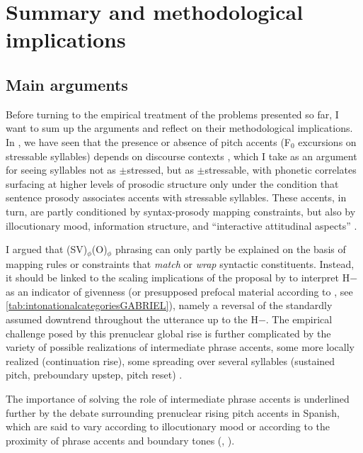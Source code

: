 
\chapter{Summary and methodological implications}
\label{ch:4} %

\section{Main arguments}
\label{ch:4.1}

Before turning to the empirical treatment of the problems presented so far, I want to sum up the arguments and reflect on their methodological implications. In , we have seen that the presence or absence of pitch accents (F$_{0}$ excursions on stressable syllables) depends on discourse contexts \citep[74]{OrtegaLlebariaPrieto.2011}, which I take as an argument for seeing syllables not as $\pm$stressed, but as $\pm$stressable, with phonetic correlates surfacing at higher levels of prosodic structure only under the condition that sentence prosody associates accents with stressable syllables. These accents, in turn, are partly conditioned by syntax-prosody mapping constraints, but also by illocutionary mood, information structure, and ``interactive attitudinal aspects'' \citep[156]{Fery.2017}. 

I argued that (SV)$_\phi$(O)$_\phi$ phrasing can only partly be explained on the basis of mapping rules or constraints that \textit{match} or \textit{wrap} syntactic constituents. Instead, it should be linked to the scaling implications of the proposal by \citet[110--112]{Hualde.2002} to interpret H$-$ as an indicator of givenness (or presupposed prefocal material according to \cite{Gabriel2007}, see \autoref{tab:intonationalcategoriesGABRIEL}), namely a reversal of the standardly assumed downtrend throughout the utterance up to the H$-$. The empirical challenge posed by this prenuclear global rise is further complicated by the variety of possible realizations of intermediate phrase accents, some more locally realized (continuation rise), some spreading over several syllables (sustained pitch, preboundary upstep, pitch reset) \citep{GabrielFeldhausenPeskova2011}. 

The importance of solving the role of intermediate phrase accents is underlined further by the debate surrounding prenuclear rising pitch accents in Spanish, which are said to vary according to illocutionary mood \citep{FacePrieto.2007} or according to the proximity of phrase accents and boundary tones (\cite[106]{Hualde.2002}, \cite{Gabriel2007}).

